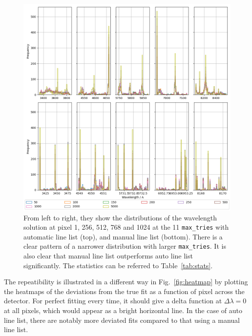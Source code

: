 \documentclass{aa}
\begin{document}
\begin{figure}[h]
    \centering
    \includegraphics[width=\textwidth]{figure_5_wavelengths.png}
    \caption{From left to right, they show the distributions of the wavelength solution at pixel 1, 256, 512, 768 and 1024 at the 11 \texttt{max\_tries} with automatic line list (top), and manual line list (bottom). There is a clear pattern of a narrower distribution with larger \texttt{max\_tries}. It is also clear that manual line list outperforms auto line list significantly. The statistics can be referred to Table~\ref{tab:stats}.}
    \label{fig:wavelengths}
\end{figure}


The repeatibility is illustrated in a different way in Fig.~\ref{fig:heatmap} by
plotting the heatmaps of the deviations from the true fit as a function of pixel
across the detector. For perfect fitting every time, it should give a delta function
at $\Delta \lambda = 0$ at all pixels, which would appear as a bright horizontal line.
In the case of auto line list, there are notably more deviated fits compared to
that using a manual line list. 
\end{document}
